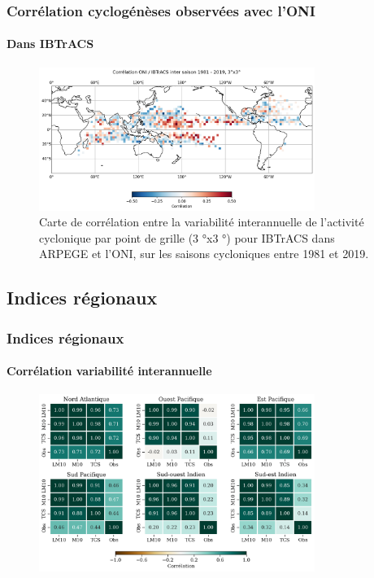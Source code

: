 \documentclass[aspectratio=169, usepdftitle=false, xcolor={dvipsnames}, 9pt,table]{beamer}
\begin{document}
\begin{frame}[c]
    \frametitle{Corrélation cyclogénèses observées avec l'ONI}
    \framesubtitle{Dans IBTrACS}
    \begin{figure}
        \centering
        \includegraphics[width=0.8\textwidth]{Figures/Annexes/correlation_ONI34_ibtracs.png}
        \caption{\small Carte de corrélation entre la variabilité interannuelle de l’activité cyclonique par point de grille (3 °x3 °) pour IBTrACS dans ARPEGE
        et l’ONI, sur les saisons cycloniques entre 1981 et 2019.}
    \end{figure}
\end{frame}

\subsection*{Indices régionaux}
\begin{frame}[c]
    \frametitle{Indices régionaux}
    \framesubtitle{Corrélation variabilité interannuelle}

    \begin{figure}
        \centering
        \includegraphics[width=0.8\textwidth]{Figures/Annexes/corr_lm10_m10_ibt.png}
    \end{figure}
    
\end{frame}
\end{document}

